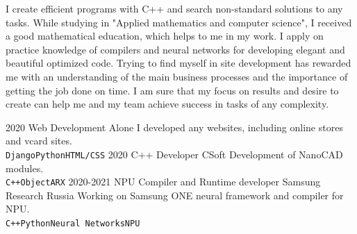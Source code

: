 \documentclass[9pt]{developercv} %
\begin{document}
\begin{minipage}[t]{0.4\textwidth} %
	\vspace{-\baselineskip} %
I create efficient programs with C++ and search non-standard solutions to any tasks. While studying in "Applied mathematics and computer science", I received a good mathematical education, which helps to me in my work. I apply on practice knowledge of compilers and neural networks for developing elegant and beautiful optimized code. Trying to find myself in site development has rewarded me with an understanding of the main business processes and the importance of getting the job done on time.  I am sure that my focus on results and desire to create can help me and my team achieve success in tasks of any complexity. 

\end{minipage}
\hfill %
\begin{minipage}[t]{0.5\textwidth} %
	\vspace{-\baselineskip} %
	\begin{barchart}{5.5}
	\end{barchart}
	\vspace{0.3cm}
	\begin{center}
    \end{center}
\end{minipage}

\vspace{0.2cm}



\begin{entrylist}
	\entry
		{2020}
		{Web Development}
		{Alone}
		{I developed any websites, including online stores and vcard sites.\\
		\texttt{Django}\slashsep\texttt{Python}\slashsep\texttt{HTML/CSS}}
	\entry
		{2020}
		{C++ Developer}
		{CSoft}
		{Development of NanoCAD modules.  \\
		\texttt{C++}\slashsep\texttt{ObjectARX}}
	\entry
		{2020-2021}
		{NPU Compiler and Runtime developer}
		{Samsung Research Russia}
		{Working on Samsung ONE neural framework and compiler for NPU.  \\
		\texttt{C++}\slashsep\texttt{Python}\slashsep\texttt{Neural Networks}\slashsep\texttt{NPU}}
		
\end{entrylist}
\end{document}
